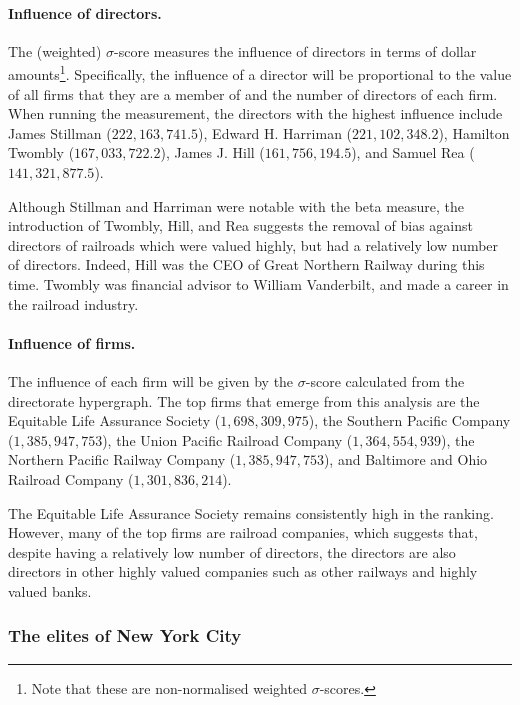 \paragraph{Influence of directors.}

The (weighted) $\sigma$-score measures the influence of directors in terms of dollar amounts\footnote{Note that these are non-normalised weighted $\sigma$-scores.}. Specifically, the influence of a director will be proportional to the value of all firms that they are a member of and the number of directors of each firm. When running the measurement, the directors with the highest influence include James Stillman ($222,163,741.5$), Edward H. Harriman ($221,102,348.2$), Hamilton Twombly ($167,033,722.2$), James J. Hill ($161,756,194.5$), and Samuel Rea ($141,321,877.5$).

Although Stillman and Harriman were notable with the beta measure, the introduction of Twombly, Hill, and Rea suggests the removal of bias against directors of railroads which were valued highly, but had a relatively low number of directors. Indeed, Hill was the CEO of Great Northern Railway during this time. Twombly was financial advisor to William Vanderbilt, and made a career in the railroad industry.

\paragraph{Influence of firms.}

The influence of each firm will be given by the $\sigma$-score calculated from the directorate hypergraph. The top firms that emerge from this analysis are the Equitable Life Assurance Society ($1,698,309,975$), the Southern Pacific Company ($1,385,947,753$), the Union Pacific Railroad Company ($1,364,554,939$), the Northern Pacific Railway Company ($1,385,947,753$), and Baltimore and Ohio Railroad Company ($1,301,836,214$).

The Equitable Life Assurance Society remains consistently high in the ranking. However, many of the top firms are railroad companies, which suggests that, despite having a relatively low number of directors, the directors are also directors in other highly valued companies such as other railways and highly valued banks.

\subsubsection*{The elites of New York City}

